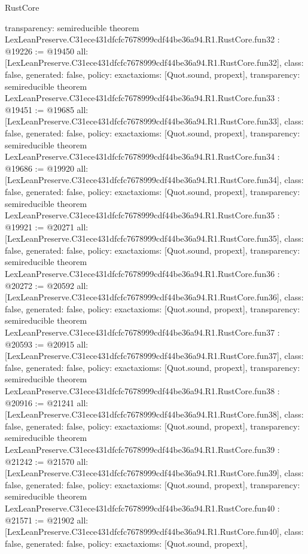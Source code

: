 \begin{lexlean}{RustCore}
\begin{coremodule}
{  transparency: semireducible
}
theorem LexLeanPreserve.C31ece431dfcfc7678999cdf44be36a94.R1.RustCore.fun32 : @19226 := @19450 {
  all: [LexLeanPreserve.C31ece431dfcfc7678999cdf44be36a94.R1.RustCore.fun32],
  class: false,
  generated: false,
  policy: exact{axioms: [Quot.sound, propext]},
  transparency: semireducible
}
theorem LexLeanPreserve.C31ece431dfcfc7678999cdf44be36a94.R1.RustCore.fun33 : @19451 := @19685 {
  all: [LexLeanPreserve.C31ece431dfcfc7678999cdf44be36a94.R1.RustCore.fun33],
  class: false,
  generated: false,
  policy: exact{axioms: [Quot.sound, propext]},
  transparency: semireducible
}
theorem LexLeanPreserve.C31ece431dfcfc7678999cdf44be36a94.R1.RustCore.fun34 : @19686 := @19920 {
  all: [LexLeanPreserve.C31ece431dfcfc7678999cdf44be36a94.R1.RustCore.fun34],
  class: false,
  generated: false,
  policy: exact{axioms: [Quot.sound, propext]},
  transparency: semireducible
}
theorem LexLeanPreserve.C31ece431dfcfc7678999cdf44be36a94.R1.RustCore.fun35 : @19921 := @20271 {
  all: [LexLeanPreserve.C31ece431dfcfc7678999cdf44be36a94.R1.RustCore.fun35],
  class: false,
  generated: false,
  policy: exact{axioms: [Quot.sound, propext]},
  transparency: semireducible
}
theorem LexLeanPreserve.C31ece431dfcfc7678999cdf44be36a94.R1.RustCore.fun36 : @20272 := @20592 {
  all: [LexLeanPreserve.C31ece431dfcfc7678999cdf44be36a94.R1.RustCore.fun36],
  class: false,
  generated: false,
  policy: exact{axioms: [Quot.sound, propext]},
  transparency: semireducible
}
theorem LexLeanPreserve.C31ece431dfcfc7678999cdf44be36a94.R1.RustCore.fun37 : @20593 := @20915 {
  all: [LexLeanPreserve.C31ece431dfcfc7678999cdf44be36a94.R1.RustCore.fun37],
  class: false,
  generated: false,
  policy: exact{axioms: [Quot.sound, propext]},
  transparency: semireducible
}
theorem LexLeanPreserve.C31ece431dfcfc7678999cdf44be36a94.R1.RustCore.fun38 : @20916 := @21241 {
  all: [LexLeanPreserve.C31ece431dfcfc7678999cdf44be36a94.R1.RustCore.fun38],
  class: false,
  generated: false,
  policy: exact{axioms: [Quot.sound, propext]},
  transparency: semireducible
}
theorem LexLeanPreserve.C31ece431dfcfc7678999cdf44be36a94.R1.RustCore.fun39 : @21242 := @21570 {
  all: [LexLeanPreserve.C31ece431dfcfc7678999cdf44be36a94.R1.RustCore.fun39],
  class: false,
  generated: false,
  policy: exact{axioms: [Quot.sound, propext]},
  transparency: semireducible
}
theorem LexLeanPreserve.C31ece431dfcfc7678999cdf44be36a94.R1.RustCore.fun40 : @21571 := @21902 {
  all: [LexLeanPreserve.C31ece431dfcfc7678999cdf44be36a94.R1.RustCore.fun40],
  class: false,
  generated: false,
  policy: exact{axioms: [Quot.sound, propext]},
}
\end{coremodule}
\end{lexlean}
